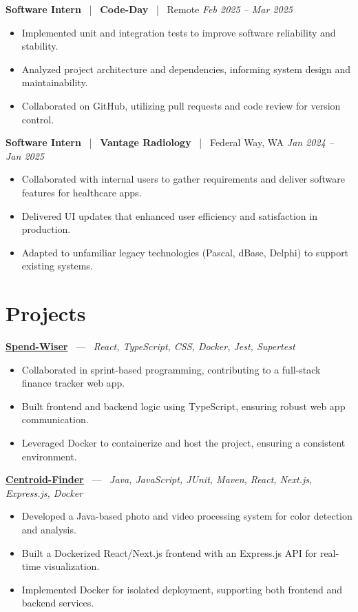 \documentclass[10pt, letterpaper]{article}
\newcommand{\jobhead}[4]{%
  \vspace{5pt}%
  {\bfseries\color{dark}#1}%
  ~{\color{light}|}~%
  {\bfseries\color{navy}#2}%
  ~{\color{light}|}~%
  {\color{light}#3}%
  \hfill{\color{light}\small\textit{#4}}\\[-2pt]%
}
\newcommand{\projhead}[3]{%
  \vspace{5pt}%
  {\bfseries\color{dark}\href{#2}{#1}}%
  ~{\color{light}---}~%
  {\color{light}\small\textit{#3}}\\[-2pt]%
}
\begin{document}
\jobhead{Software Intern}{Code-Day}{Remote}{Feb 2025 – Mar 2025}
\begin{itemize}
  \item Implemented unit and integration tests to improve software reliability and stability.
  \item Analyzed project architecture and dependencies, informing system design and maintainability.
  \item Collaborated on GitHub, utilizing pull requests and code review for version control.
\end{itemize}

\jobhead{Software Intern}{Vantage Radiology}{Federal Way, WA}{Jan 2024 – Jan 2025}
\begin{itemize}
  \item Collaborated with internal users to gather requirements and deliver software features for healthcare apps.
  \item Delivered UI updates that enhanced user efficiency and satisfaction in production.
  \item Adapted to unfamiliar legacy technologies (Pascal, dBase, Delphi) to support existing systems.
\end{itemize}

\section{Projects}

\projhead{Spend-Wiser}{https://github.com/JesseChum/w26-sdev372-spendwiser-finance-tracker}{React, TypeScript, CSS, Docker, Jest, Supertest}
\begin{itemize}
  \item Collaborated in sprint-based programming, contributing to a full-stack finance tracker web app.
  \item Built frontend and backend logic using TypeScript, ensuring robust web app communication.
  \item Leveraged Docker to containerize and host the project, ensuring a consistent environment.
\end{itemize}

\projhead{Centroid-Finder}{https://github.com/xavierb117/centroid-finder}{Java, JavaScript, JUnit, Maven, React, Next.js, Express.js, Docker}
\begin{itemize}
  \item Developed a Java-based photo and video processing system for color detection and analysis.
  \item Built a Dockerized React/Next.js frontend with an Express.js API for real-time visualization.
  \item Implemented Docker for isolated deployment, supporting both frontend and backend services.
\end{itemize}
\end{document}

